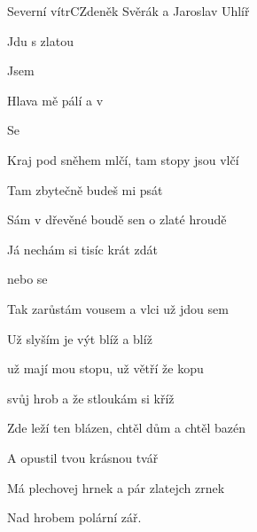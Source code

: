 \setcounter{page}{78}
\begin{song}{Severní vítr}{C}{Zdeněk Svěrák a Jaroslav Uhlíř}

\begin{SBVerse}

Jdu s  zlatou

Jsem 

Hlava mě pálí a v 

Se 

\end{SBVerse}

\begin{SBVerse}

Kraj pod sněhem mlčí, tam stopy jsou vlčí

Tam zbytečně budeš mi psát

Sám v dřevěné boudě sen o zlaté hroudě

Já nechám si tisíc krát zdát

\end{SBVerse}

\begin{SBChorus}

 

 nebo se 

\end{SBChorus}

\begin{SBVerse}

Tak zarůstám vousem a vlci už jdou sem

Už slyším je výt blíž a blíž

už mají mou stopu, už větří že kopu

svůj hrob a že stloukám si kříž

\end{SBVerse}

\begin{SBVerse}

Zde leží ten blázen, chtěl dům a chtěl bazén

A opustil tvou krásnou tvář

Má plechovej hrnek a pár zlatejch zrnek

Nad hrobem polární zář.

\end{SBVerse}

\end{song}

\pagebreak
